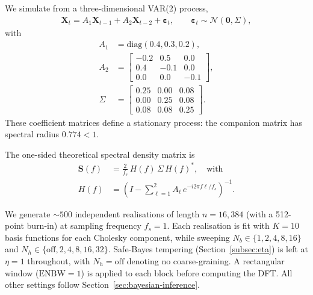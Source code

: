 \documentclass[%
	reprint,
	nofootinbib,
	amsmath,
	amssymb,
	aps,
]{revtex4-2}
\begin{document}
	We simulate from a three-dimensional VAR(2) process,
	\begin{align}
		\mathbf{X}_{t} = A_{1} \mathbf{X}_{t-1}+ A_{2} \mathbf{X}_{t-2}+ \boldsymbol{\varepsilon}_{t}, \qquad \boldsymbol{\varepsilon}_{t} \sim \mathcal{N}(\mathbf{0}, \Sigma),
	\end{align}
	with
	\begin{align}
		A_{1}  & = \mathrm{diag}(0.4, 0.3, 0.2),                                                   \\
		A_{2}  & = \begin{bmatrix}-0.2&0.5&0.0 \\ 0.4&-0.1&0.0 \\ 0.0&0.0&-0.1\end{bmatrix},       \\
		\Sigma & = \begin{bmatrix}0.25&0.00&0.08 \\ 0.00&0.25&0.08 \\ 0.08&0.08&0.25\end{bmatrix}.
	\end{align}
	These coefficient matrices define a stationary process: the companion
	matrix has spectral radius $0.774<1$.
    
	The one-sided theoretical spectral density matrix is
	\begin{align}
		\mathbf{S}(f) &= \frac{2}{f_{s}}\,H(f)\,\Sigma\,H(f)^{*}, \quad \text{with}\\
		H(f) &= \left(I-\sum_{\ell=1}^{2}A_{\ell}\, e^{-i2\pi f\ell/f_{s}}\right)^{-1}.
	\end{align}

	We generate $\sim 500$ independent realisations of length $n=16{,}384$
	(with a 512-point burn-in) at sampling frequency $f_{s}=1$. Each
	realisation is fit with $K=10$ basis functions for each Cholesky
	component, while sweeping
	$N_{b}\in\{1,2,4,8,16\}$ and $N_{h}\in\{\text{off},2,4,8,16,32\}$.
	Safe-Bayes tempering (Section~\ref{subsec:eta}) is left at $\eta=1$
	throughout, with $N_{h}=\text{off}$ denoting no coarse-graining.
	A rectangular window ($\mathrm{ENBW}=1$) is applied to each block before
	computing the DFT.
	All other settings follow Section~\ref{sec:bayesian-inference}.
\end{document}
